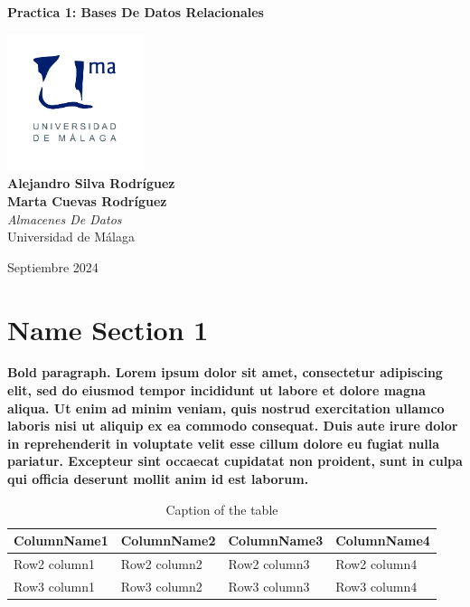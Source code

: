 \documentclass{llncs}
\begin{document}
\begin{titlepage}
	\centering
	\vspace*{3cm}
	
	{\Huge \textbf{Practica 1: Bases De Datos Relacionales}\\[0.5cm]}
	
	\vspace{2cm}
	\includegraphics[width=0.3\textwidth]{images/uma_logo.jpg}\\[1cm]
	
	{\LARGE \textbf{Alejandro Silva Rodríguez}\\[0.5cm]}
	{\LARGE \textbf{Marta Cuevas Rodríguez}\\[0.5cm]}
	{\large \textit{Almacenes De Datos}\\
		Universidad de Málaga\\
		}
	
	\vfill
	
	{\large Septiembre 2024}
\end{titlepage}


\section{Name Section 1}

\textbf{Bold paragraph. Lorem ipsum dolor sit amet, consectetur adipiscing elit, sed do eiusmod tempor incididunt ut labore et dolore magna aliqua. Ut enim ad minim veniam, quis nostrud exercitation ullamco laboris nisi ut aliquip ex ea commodo consequat. Duis aute irure dolor in reprehenderit in voluptate velit esse cillum dolore eu fugiat nulla pariatur. Excepteur sint occaecat cupidatat non proident, sunt in culpa qui officia deserunt mollit anim id est laborum.}

\begin{table}
    \label{tab:example1}
 	\caption{Caption of the table}
	\centering
	\begin{tabular}{C|CCC}
 		\toprule
 		ColumnName1 & ColumnName2 & ColumnName3  & ColumnName4 \\
 		\midrule
 		Row2 column1 & Row2 column2 & Row2 column3 & Row2 column4 \\
   		Row3 column1 & Row3 column2 & Row3 column3 & Row3 column4 \\
 		\bottomrule
 	\end{tabular}
\end{table}
 
\end{document}
